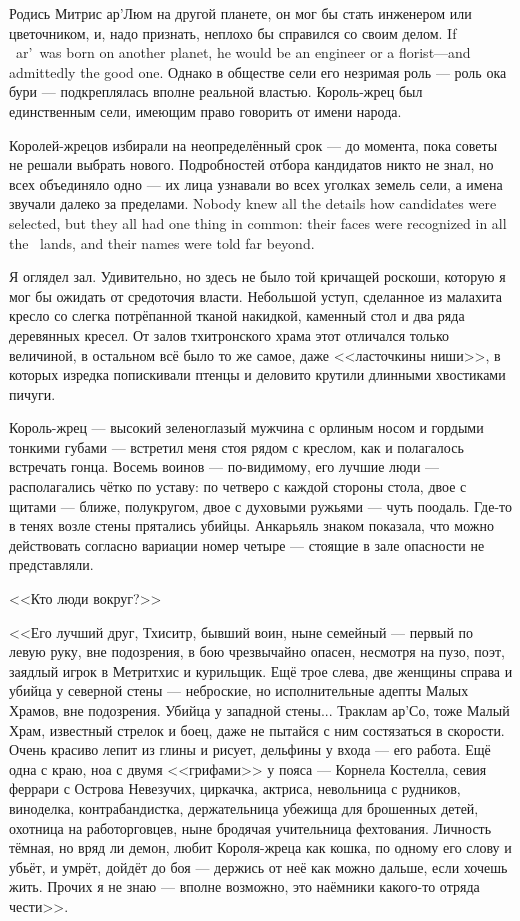 {Родись Митрис ар'Люм на другой планете, он мог бы стать инженером или цветочником, и, надо признать, неплохо бы справился со своим делом.}
{If \Mitris\ ar'\Loem\ was born on another planet, he would be an engineer or a florist---and admittedly the good one.}
Однако в обществе сели его незримая роль --- роль ока бури --- подкреплялась вполне реальной властью.
Король-жрец был единственным сели, имеющим право говорить от имени народа.

Королей-жрецов избирали на неопределённый срок --- до момента, пока советы не решали выбрать нового.
{Подробностей отбора кандидатов никто не знал, но всех объединяло одно --- их лица узнавали во всех уголках земель сели, а имена звучали далеко за пределами.}
{Nobody knew all the details how candidates were selected, but they all had one thing in common: their faces were recognized in all the \Seli\ lands, and their names were told far beyond.}

Я оглядел зал.
Удивительно, но здесь не было той кричащей роскоши, которую я мог бы ожидать от средоточия власти.
Небольшой уступ, сделанное из малахита кресло со слегка потрёпанной тканой накидкой, каменный стол и два ряда деревянных кресел.
От залов тхитронского храма этот отличался только величиной, в остальном всё было то же самое, даже <<ласточкины ниши>>, в которых изредка попискивали птенцы и деловито крутили длинными хвостиками пичуги.

Король-жрец --- высокий зеленоглазый мужчина с орлиным носом и гордыми тонкими губами --- встретил меня стоя рядом с креслом, как и полагалось встречать гонца.
Восемь воинов --- по-видимому, его лучшие люди --- располагались чётко по уставу: по четверо с каждой стороны стола, двое с щитами --- ближе, полукругом, двое с духовыми ружьями --- чуть поодаль.
Где-то в тенях возле стены прятались убийцы.
Анкарьяль знаком показала, что можно действовать согласно вариации номер четыре --- стоящие в зале опасности не представляли.

<<Кто люди вокруг?>>

<<Его лучший друг, Тхиситр, бывший воин, ныне семейный --- первый по левую руку, вне подозрения, в бою чрезвычайно опасен, несмотря на пузо, поэт, заядлый игрок в Метритхис и курильщик.
Ещё трое слева, две женщины справа и убийца у северной стены --- неброские, но исполнительные адепты Малых Храмов, вне подозрения.
Убийца у западной стены... Траклам ар'Со, тоже Малый Храм, известный стрелок и боец, даже не пытайся с ним состязаться в скорости.
Очень красиво лепит из глины и рисует, дельфины у входа --- его работа.
Ещё одна с краю, ноа с двумя <<грифами>> у пояса --- Корнела Костелла, севия феррари с Острова Невезучих, циркачка, актриса, невольница с рудников, виноделка, контрабандистка, держательница убежища для брошенных детей, охотница на работорговцев, ныне бродячая учительница фехтования.
Личность тёмная, но вряд ли демон, любит Короля-жреца как кошка, по одному его слову и убьёт, и умрёт, дойдёт до боя --- держись от неё как можно дальше, если хочешь жить.
Прочих я не знаю --- вполне возможно, это наёмники какого-то отряда чести>>.

